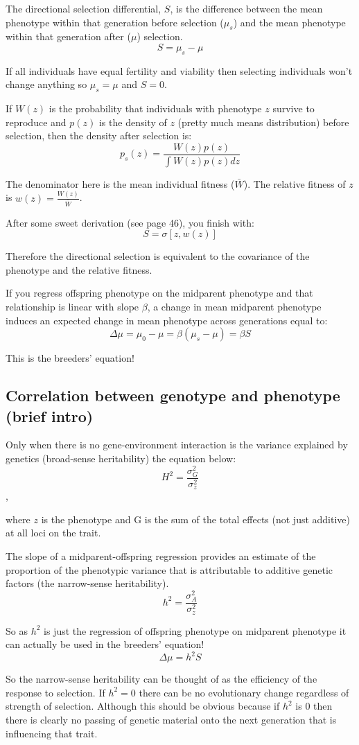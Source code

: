 \documentclass[
]{article}
\begin{document}
The directional selection differential, \(S\), is the difference between
the mean phenotype within that generation before selection (\(\mu_s\))
and the mean phenotype within that generation after (\(\mu\)) selection.
\[S = \mu_s - \mu\]

If all individuals have equal fertility and viability then selecting
individuals won't change anything so \(\mu_s = \mu\) and \(S = 0\).

If \(W(z)\) is the probability that individuals with phenotype \(z\)
survive to reproduce and \(p(z)\) is the density of \(z\) (pretty much
means distribution) before selection, then the density after selection
is: \[p_{s}(z) = \frac{W(z)p(z)} {\int W(z)p(z)dz}\]

The denominator here is the mean individual fitness (\(\bar{W}\)). The
relative fitness of \(z\) is \(w(z) = \frac{W(z)} {\bar{W}}\).

After some sweet derivation (see page 46), you finish with:
\[S = \sigma[z, w(z)]\]

Therefore the directional selection is equivalent to the covariance of
the phenotype and the relative fitness.

If you regress offspring phenotype on the midparent phenotype and that
relationship is linear with slope \(\beta\), a change in mean midparent
phenotype induces an expected change in mean phenotype across
generations equal to:
\[\Delta\mu = \mu_0 - \mu = \beta(\mu_s - \mu) = \beta{S}\]

This is the breeders' equation!

\hypertarget{correlation-between-genotype-and-phenotype-brief-intro}{%
\subsection{Correlation between genotype and phenotype (brief
intro)}\label{correlation-between-genotype-and-phenotype-brief-intro}}

Only when there is no gene-environment interaction is the variance
explained by genetics (broad-sense heritability) the equation below:
\[H^2 = \frac{\sigma^2_G} {\sigma^2_z}\],

where \(z\) is the phenotype and G is the sum of the total effects (not
just additive) at all loci on the trait.

The slope of a midparent-offspring regression provides an estimate of
the proportion of the phenotypic variance that is attributable to
additive genetic factors (the narrow-sense heritability).
\[h^2 = \frac{\sigma^2_A} {\sigma^2_z}\]

So as \(h^2\) is just the regression of offspring phenotype on midparent
phenotype it can actually be used in the breeders' equation!
\[\Delta\mu = h^2S\]

So the narrow-sense heritability can be thought of as the efficiency of
the response to selection. If \(h^2 = 0\) there can be no evolutionary
change regardless of strength of selection. Although this should be
obvious because if \(h^2\) is 0 then there is clearly no passing of
genetic material onto the next generation that is influencing that
trait.
\end{document}
